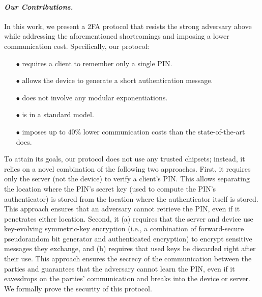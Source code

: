 \vspace{-4mm}
\paragraph{\textbf{\textit{Our Contributions.}}}  In this work, we present a 2FA protocol that resists the strong adversary above while addressing the aforementioned shortcomings and imposing a lower communication cost. Specifically, our protocol:

\vspace{-2mm}
\begin{itemize}
\item[$\bullet$] requires a client to remember only a single PIN.

\item[$\bullet$] {allows the device to generate a short authentication message.} 

\item[$\bullet$] does not involve any modular exponentiations.

\item[$\bullet$] is in a standard model.

\item[$\bullet$]  imposes up to $40\%$ lower communication costs than the state-of-the-art does. 


\end{itemize}

\vspace{-2mm}

 To attain its goals, our protocol does not use any trusted chipsets; instead, it relies on a novel combination of the following two approaches. First, it requires only the server  (not the device) to verify a client’s PIN. This allows separating the location where the PIN’s secret key (used to compute the PIN’s authenticator) is stored from the location where the authenticator itself is stored. This approach ensures that an adversary cannot retrieve the PIN, even if it penetrates either location.  Second, it  (a) requires that the server and device use key-evolving symmetric-key encryption (i.e., a combination of forward-secure pseudorandom bit generator and authenticated encryption) to encrypt sensitive messages they exchange,  and (b) requires that used keys be discarded right after their use. This approach ensures the secrecy of the communication between the parties and guarantees that the adversary cannot learn the PIN, even if it eavesdrops on the parties' communication and breaks into the device or server. We formally prove the security of this protocol. 


